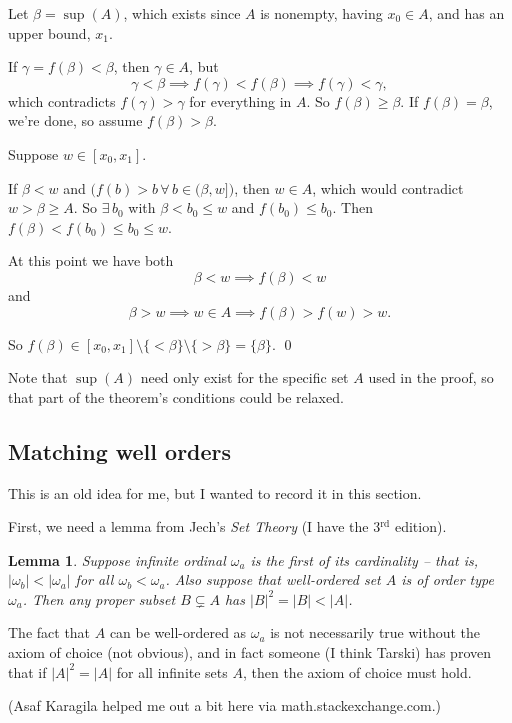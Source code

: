 \documentclass[11pt]{amsart}
\newtheorem{Lemma}[Def]{Lemma}
\newcommand\epf{\qed\medskip}
\newcommand{\up}[1]{\ensuremath{^{\textrm{#1}}}}
\begin{document}
Let $\beta = \sup (A)$, which exists since $A$ is nonempty,
having $x_0 \in A$, and has an upper bound, $x_1$.

If $\gamma = f(\beta) < \beta$, then $\gamma \in A$, but
$$ \gamma < \beta \implies f(\gamma) < f(\beta)
  \implies f(\gamma) < \gamma, $$
which contradicts
$f(\gamma) > \gamma$ for everything in $A$.
So $f(\beta) \ge \beta$. If $f(\beta) = \beta$, we're done,
so assume $f(\beta) > \beta$.

Suppose $w \in [x_0, x_1]$.

If $\beta < w$ and $\big(f(b) > b \,\forall\, b \in (\beta, w]\big)$,
then $w \in A$, which would contradict $w > \beta \ge A$.
So $\exists\, b_0$ with $\beta < b_0 \le w$
and $f(b_0) \le b_0$.  Then $f(\beta) < f(b_0) \le b_0 \le w$.

At this point we have both
$$ \beta < w \implies f(\beta) < w $$
and
$$ \beta > w \implies w \in A \implies f(\beta) > f(w) > w.$$

So $f(\beta) \in [x_0, x_1] \setminus \{ < \beta \} \setminus \{ > \beta \} = \{\beta\}$.
\epf

Note that $\sup (A)$ need only  exist for the specific set $A$
used in the proof, so that part of the theorem's conditions could be relaxed.

\subsection{Matching well orders}

This is an old idea for me, but I wanted to record it in this section.

First, we need a lemma from Jech's {\em Set Theory} (I have the 3\up{rd} edition).

\begin{Lemma}\label{b_squared_is_b_lemma}
Suppose infinite ordinal $\omega_a$ is the first  of its cardinality -- that is, $|\omega_b| < |\omega_a|$
for all $\omega_b < \omega_a$.
Also suppose that well-ordered set $A$ is of order type $\omega_a$. Then any
proper subset $B \subsetneq A$ has $|B|^2 = |B| < |A|$.
\end{Lemma}

The fact that $A$ can be well-ordered as $\omega_a$ is not necessarily true without
the axiom of choice (not obvious), and in fact someone (I think Tarski) has proven that
if $|A|^2=|A|$ for all infinite sets $A$, then the axiom of choice must hold.

(Asaf Karagila helped me out a bit here via math.stackexchange.com.)
\end{document}
